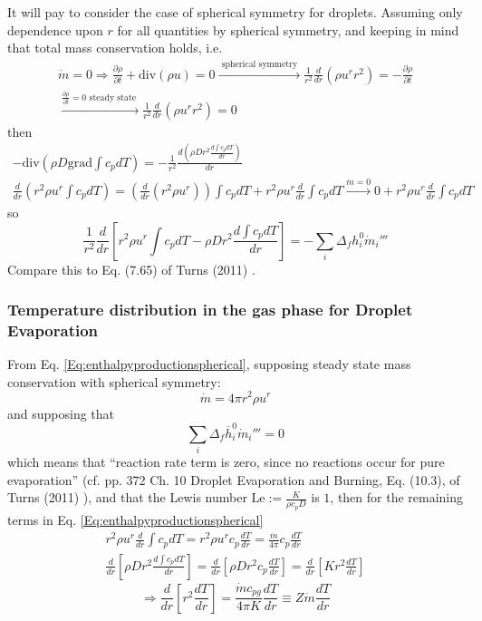 \documentclass[10pt]{amsart}
\begin{document}
\begin{multicols*}{2}
It will pay to consider the case of spherical symmetry for droplets.  Assuming only dependence upon $r$ for all quantities by spherical symmetry, and keeping in mind that total mass conservation holds, i.e.
\[
\begin{gathered}
\dot{m} =0 \Longrightarrow \frac{ \partial \rho}{ \partial t} + \text{div}(\rho u ) = 0 \xrightarrow{ \text{ spherical symmetry } } \frac{1}{r^2} \frac{d}{dr} ( \rho u^r r^2 ) = -\frac{ \partial \rho}{ \partial t} \\
  \xrightarrow{ \frac{ \partial \rho }{ \partial t } = 0 \text{ steady state } } \frac{1}{r^2} \frac{d}{dr} (\rho u^r r^2 ) = 0 
\end{gathered}
\]
then
\[
\begin{gathered}
  -\text{div}( \rho D \text{grad} \int c_p dT) = -\frac{1}{r^2} \frac{d(\rho Dr^2 \frac{d \int c_p dT }{dr} ) }{ dr} \\ 
  \frac{d}{dr} ( r^2 \rho u^r \int c_p dT  ) = \left( \frac{d}{dr} (r^2 \rho u^r) \right) \int c_p dT + r^2 \rho u^r \frac{d}{dr} \int c_p dT \xrightarrow{\dot{m}=0} 0 + r^2 \rho u^r \frac{d}{dr} \int c_p dT
\end{gathered}
\]
so
\begin{equation}\label{Eq:enthalpyproductionspherical}
\frac{1}{r^2} \frac{d}{dr} \left[ r^2 \rho u^r \int c_p dT - \rho Dr^2 \frac{d\int c_p dT}{dr} \right] = -\sum_i \Delta_f h_i^0 \dot{m}_i'''
\end{equation}
Compare this to Eq. (7.65) of Turns (2011) \cite{STurns2011}.  

\subsubsection{Temperature distribution in the gas phase for Droplet Evaporation }

From Eq. \ref{Eq:enthalpyproductionspherical}, supposing steady state mass conservation with spherical symmetry:
\[
\dot{m} = 4\pi r^2 \rho u^r
\]
and supposing that 
\[
\sum_i \Delta_f \overline{h}_i^0 \dot{m}_i''' = 0 
\]
which means that ``reaction rate term is zero, since no reactions occur for pure evaporation'' (cf. pp. 372 Ch. 10 Droplet Evaporation and Burning, Eq. (10.3), of Turns (2011) \cite{STurns2011}), and that the Lewis number $\text{Le} := \frac{K}{\rho c_pD}$ is $1$, then for the remaining terms in Eq. \ref{Eq:enthalpyproductionspherical}
\[
\begin{gathered}
  r^2 \rho u^r \frac{d}{dr} \int c_p dT = r^2 \rho u^r c_p \frac{dT}{dr} = \frac{ \dot{m}}{4\pi } c_p \frac{dT}{dr} \\ 
  \frac{d}{dr} \left[ \rho Dr^2 \frac{d\int c_p dT }{ dr} \right] = \frac{d}{dr} \left[ \rho Dr^2 c_p \frac{dT}{dr} \right] = \frac{d}{dr} \left[ K r^2 \frac{dT}{dr} \right]
\end{gathered}
\]
\[
\Longrightarrow \frac{d}{dr} \left[ r^2 \frac{dT}{dr} \right] = \frac{ \dot{m} c_{pg}}{ 4\pi K} \frac{dT}{dr} \equiv Z \dot{m} \frac{dT}{dr} 
\]


\end{multicols*}
\end{document}
